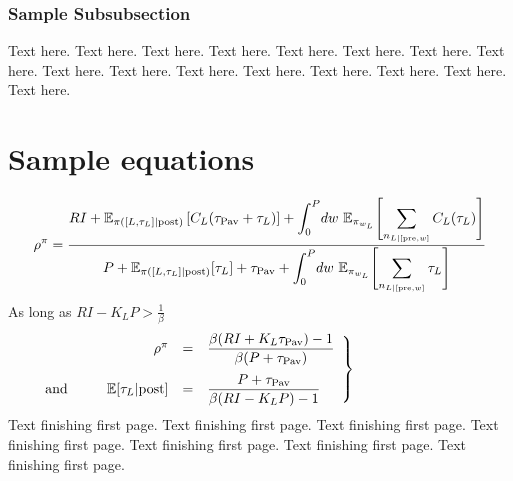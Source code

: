 \documentclass[NETN,manuscript]{stjour-new}
\def\taupav{\tau_{\mathrm{Pav}}}
\begin{document}
\subsubsection{Sample Subsubsection}
Text here. Text here. Text here. Text here.
Text here. Text here. Text here. Text here.
Text here. Text here. Text here. Text here.
Text here. Text here. Text here. Text here.


\section{Sample equations}
\begin{equation}
\label{eq:rhoCHT}
\rho^{\pi}= \frac{RI + \mathbb{E}_{\pi([L,\tau_L]|\textrm{post})}
\left[C_L(\taupav+\tau_L) \right]   +
\displaystyle{\int_{0}^{P}}{dw~ \mathbb{E}_{\pi_{w_L}}}
\Biggl[\/\sum_{n_{L|[\textrm{pre},w]}}C_L(\tau_L)
\Biggr]            }      {P +
\mathbb{E}_{\pi([L,\tau_L] |\textrm{post})}[\tau_{L}] +\taupav +
\displaystyle{ \int_{0}^{P}}{dw~ \mathbb{E}_{\pi_{w_L}}}   
\Biggl[\sum_{n_{L|[\textrm{pre},w]}}\tau_L\Biggr]  
}
\end{equation}
As long as
$RI - K_LP > 
\frac{1}{\beta}$
\begin{equation}
\left.\begin{array}{lrcl}
&\rho^{\pi} &=&  \displaystyle\frac{\beta ( RI + K_L \taupav )-1} {\beta
(P+\taupav )}    \\[12pt]
\hbox{and}\hbox to .25in{\hfill}&\mathbb{E}[\tau_L | \text{post}] &=&\displaystyle \frac{P+\taupav}{\beta ( RI -
K_LP)-1}  
\label{eq:analytical_linear}
\end{array}\right\}\hbox to 1.25in{\hfill}
\end{equation} 
Text finishing first page.
Text finishing first page.
Text finishing first page.
Text finishing first page.
Text finishing first page.
Text finishing first page.
Text finishing first page.
\end{document}
